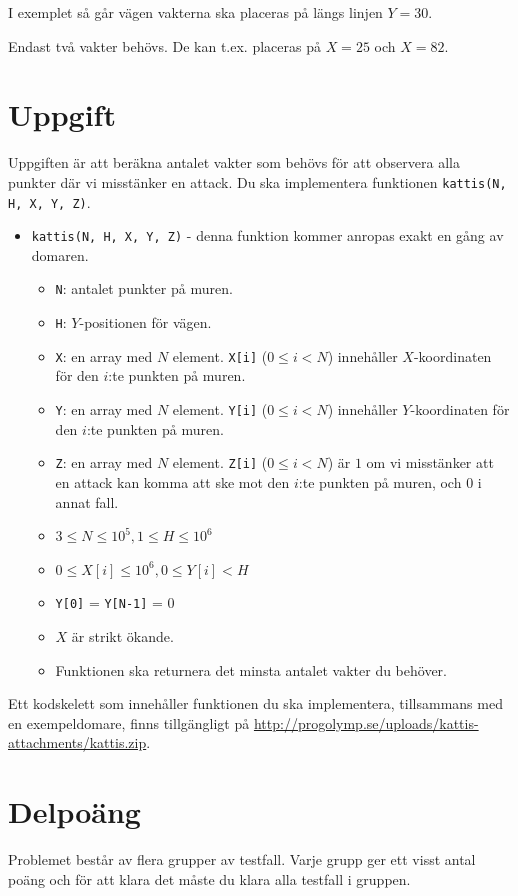 I exemplet så går vägen vakterna ska placeras på längs linjen $Y = 30$.

Endast två vakter behövs. De kan t.ex. placeras på $X = 25$ och $X = 82$.

\section*{Uppgift}
Uppgiften är att beräkna antalet vakter som behövs för att observera alla punkter där vi misstänker en attack. Du ska implementera funktionen
\texttt{kattis(N, H, X, Y, Z)}.

\begin{itemize}
  \item \texttt{kattis(N, H, X, Y, Z)} - denna funktion kommer anropas exakt en gång av domaren.
  \begin{itemize}
    \item \texttt{N}: antalet punkter på muren.
    \item \texttt{H}: $Y$-positionen för vägen.
    \item \texttt{X}: en array med $N$ element. \texttt{X[i]} ($0 \le i < N$) innehåller $X$-koordinaten för den $i$:te punkten på muren.
    \item \texttt{Y}: en array med $N$ element. \texttt{Y[i]} ($0 \le i < N$) innehåller $Y$-koordinaten för den $i$:te punkten på muren.
    \item \texttt{Z}: en array med $N$ element. \texttt{Z[i]} ($0 \le i < N$) är $1$ om vi misstänker att en attack kan komma att ske mot den $i$:te punkten på muren, och 0 i annat fall.
    \item $3 \le N \le 10^5, 1 \le H \le 10^6$
    \item $0 \le X[i] \le 10^6, 0 \le Y[i] < H$
    \item \texttt{Y[0]} = \texttt{Y[N-1]} = 0
    \item $X$ är strikt ökande.
    \item Funktionen ska returnera det minsta antalet vakter du behöver.
  \end{itemize}
\end{itemize}

Ett kodskelett som innehåller funktionen du ska implementera, tillsammans med en exempeldomare, finns tillgängligt på
\url{http://progolymp.se/uploads/kattis-attachments/kattis.zip}.

\section*{Delpoäng}
Problemet består av flera grupper av testfall. Varje grupp ger ett visst antal poäng och för att klara det måste du klara alla testfall i gruppen.

